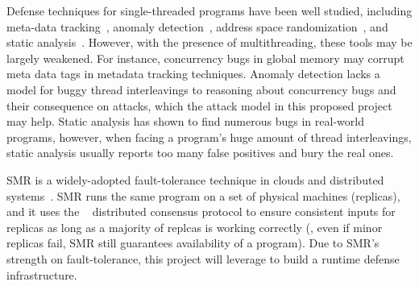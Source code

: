  Defense techniques for 
single-threaded programs have been well studied, including meta-data 
tracking~\cite{taintdroid:osdi10, lift:micro06, myers:information, 
valgrind:pldi}, anomaly 
detection~\cite{taskrecycling:ppopp90,schonberg:pldi89}, address space 
randomization~\cite{ aslr-fail:ccs04}, and static 
analysis~\cite{seth:pldi,engler:vmcai,wagner:syscall:ids,coverity:cacm, 
klee:osdi08}. However, with the presence of 
multithreading, these tools may be largely weakened. For instance, concurrency 
bugs in global memory may corrupt meta data tags in metadata tracking 
techniques. Anomaly detection lacks a model for buggy thread interleavings to 
reasoning about concurrency bugs and their consequence on attacks, which the 
attack model in this proposed project may help. Static analysis has shown to 
find numerous bugs in real-world programs, however, when facing a program's 
huge amount of thread interleavings, static analysis usually reports too many 
false positives and bury the real ones.

  SMR is a widely-adopted 
fault-tolerance technique in clouds and distributed 
systems~\cite{lamportclock,smr:tutorial}. SMR runs the same program on a set of 
physical machines (replicas), and it uses the 
\paxos~\cite{paxos,paxos:simple,paxos:complex} distributed consensus protocol to 
ensure consistent inputs for replicas as long as a majority of replcas is 
working correctly (\ie, even if minor replicas fail, SMR still guarantees 
availability of a program). Due to SMR's strength on fault-tolerance, this 
\xxx project will leverage to build a runtime defense infrastructure.



